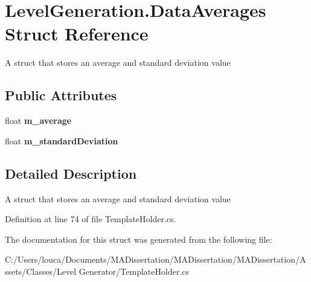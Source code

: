 \hypertarget{struct_level_generation_1_1_data_averages}{}\section{Level\+Generation.\+Data\+Averages Struct Reference}
\label{struct_level_generation_1_1_data_averages}


A struct that stores an average and standard deviation value  


\subsection*{Public Attributes}
\begin{DoxyCompactItemize}
\item 
\mbox{\label{struct_level_generation_1_1_data_averages_a937d380bef416a107dc8d00da75206b0}} 
float {\bfseries m\+\_\+average}
\item 
\mbox{\label{struct_level_generation_1_1_data_averages_a51766c79c560982148bac560a2ae789d}} 
float {\bfseries m\+\_\+standard\+Deviation}
\end{DoxyCompactItemize}


\subsection{Detailed Description}
A struct that stores an average and standard deviation value 



Definition at line 74 of file Template\+Holder.\+cs.



The documentation for this struct was generated from the following file\+:\begin{DoxyCompactItemize}
\item 
C\+:/\+Users/louca/\+Documents/\+M\+A\+Dissertation/\+M\+A\+Dissertation/\+M\+A\+Dissertation/\+Assets/\+Classes/\+Level Generator/Template\+Holder.\+cs\end{DoxyCompactItemize}
